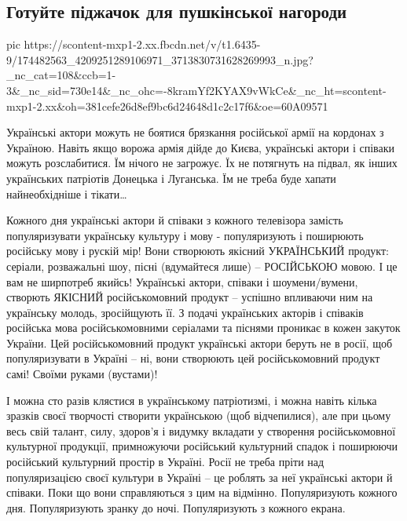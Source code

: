  
 
 
 
 
\subsection{Готуйте піджачок для пушкінської нагороди}

\ifcmt
  pic https://scontent-mxp1-2.xx.fbcdn.net/v/t1.6435-9/174482563_4209251289106971_3713830731628269993_n.jpg?_nc_cat=108&ccb=1-3&_nc_sid=730e14&_nc_ohc=-8kramYf2KYAX9vWkCe&_nc_ht=scontent-mxp1-2.xx&oh=381cefe26d8ef9bc6d24648d1c2c17f6&oe=60A09571
\fi

Українські актори можуть не боятися брязкання російської армії на кордонах з
Україною. Навіть якщо ворожа армія дійде до Києва, українські актори і співаки
можуть розслабитися. Їм нічого не загрожує. Їх не потягнуть на підвал, як інших
українських патріотів Донецька і Луганська. Їм не треба буде хапати
найнеобхідніше і тікати… 

Кожного дня українські актори й співаки з кожного телевізора замість
популяризувати українську культуру і мову -  популяризують і поширюють
російську мову і рускій мір! Вони створюють якісний УКРАЇНСЬКИЙ продукт:
серіали, розважальні шоу, пісні (вдумайтеся лише) – РОСІЙСЬКОЮ мовою. І це вам
не ширпотреб якийсь! Українські актори, співаки і шоумени/вумени, створють
ЯКІСНИЙ російськомовний продукт – успішно впливаючи ним на українську молодь,
зросійщують її. З подачі українських акторів і співаків російська мова
російськомовними серіалами та піснями проникає в кожен закуток України. Цей
російськомовний продукт українські актори беруть не в росії, щоб популяризувати
в Україні – ні, вони створюють цей російськомовний продукт самі! Своїми руками
(вустами)!

І можна сто разів клястися в українському патріотизмі, і можна навіть кілька
зразків своєї творчості створити українською (щоб відчепилися), але при цьому
весь свій талант, силу, здоров’я і видумку вкладати у створення російськомовної
культурної продукції, примножуючи російський  культурний спадок і поширюючи
російський культурний простір в Україні. Росії не треба пріти над
популяризацією своєї культури в Україні – це роблять за неї українські актори й
співаки. Поки що вони справляються з цим на відмінно. Популяризують кожного
дня. Популяризують зранку до ночі. Популяризують з кожного екрана. 

